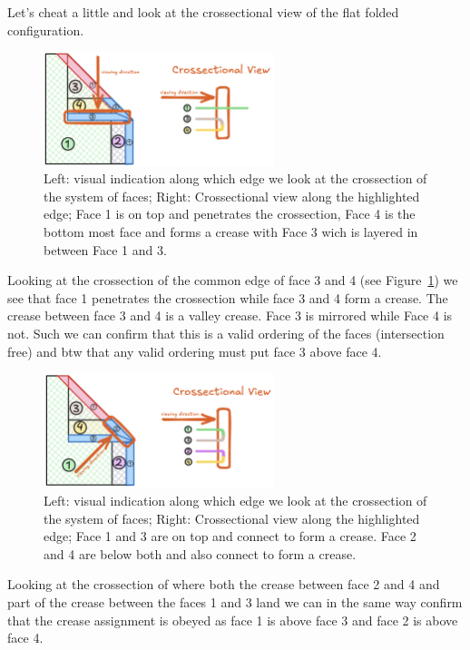 Let's cheat a little and look at the crossectional view of the flat folded configuration.

\begin{figure}[h]
\centering
\includegraphics[width=0.6\textwidth]{assets/demo_csx_taco_tortilla.png}
\caption{Left: visual indication along which edge we look at the crossection of the system of faces; Right: Crossectional view along the highlighted edge; Face 1 is on top and penetrates the crossection, Face 4 is the bottom most face and forms a crease with Face 3 wich is layered in between Face 1 and 3.}
\label{fig:demo_csx_taco_tortilla}
\end{figure}

Looking at the crossection of the common edge of face 3 and 4 (see Figure~\ref{fig:demo_csx_taco_tortilla}) we see that face 1 penetrates the crossection while face 3 and 4 form a crease.
The crease between face 3 and 4 is a valley crease. Face 3 is mirrored while Face 4 is not.
Such we can confirm that this is a valid ordering of the faces (intersection free) and btw that any valid ordering must put face 3 above face 4.

\begin{figure}[h]
\centering
\includegraphics[width=0.6\textwidth]{assets/demo_csx_taco_taco.png}
\caption{Left: visual indication along which edge we look at the crossection of the system of faces; Right: Crossectional view along the highlighted edge; Face 1 and 3 are on top and connect to form a crease. Face 2 and 4 are below both and also connect to form a crease.}
\label{fig:demo_csx_taco_taco}
\end{figure}

Looking at the crossection of where both the crease between face 2 and 4 and part of the crease between the faces 1 and 3
land we can in the same way confirm that the crease assignment is obeyed as face 1 is above face 3 and face 2 is above face 4.

